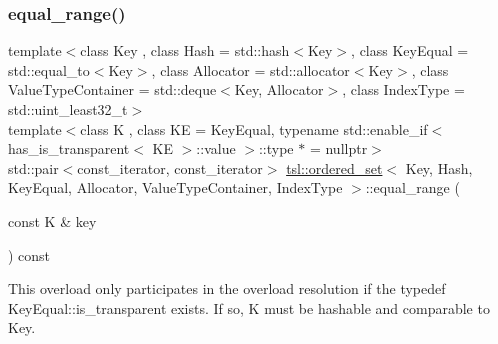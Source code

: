 \subsubsection{\texorpdfstring{equal\_range()}{equal\_range()}\hspace{0.1cm}{\footnotesize\ttfamily [5/6]}}
{\footnotesize\ttfamily template$<$class Key , class Hash  = std\+::hash$<$\+Key$>$, class Key\+Equal  = std\+::equal\+\_\+to$<$\+Key$>$, class Allocator  = std\+::allocator$<$\+Key$>$, class Value\+Type\+Container  = std\+::deque$<$\+Key, Allocator$>$, class Index\+Type  = std\+::uint\+\_\+least32\+\_\+t$>$ \\
template$<$class K , class KE  = Key\+Equal, typename std\+::enable\+\_\+if$<$ has\+\_\+is\+\_\+transparent$<$ K\+E $>$\+::value $>$\+::type $\ast$  = nullptr$>$ \\
std\+::pair$<$const\+\_\+iterator, const\+\_\+iterator$>$ \mbox{\hyperlink{classtsl_1_1ordered__set}{tsl\+::ordered\+\_\+set}}$<$ Key, Hash, Key\+Equal, Allocator, Value\+Type\+Container, Index\+Type $>$\+::equal\+\_\+range (\begin{DoxyParamCaption}\item[{const K \&}]{key }\end{DoxyParamCaption}) const\hspace{0.3cm}{\ttfamily [inline]}}





This overload only participates in the overload resolution if the typedef Key\+Equal\+::is\+\_\+transparent exists. If so, K must be hashable and comparable to Key. \mbox{\label{classtsl_1_1ordered__set_aa6f8c028631f989a0ba04df9a6e66a04}} 
